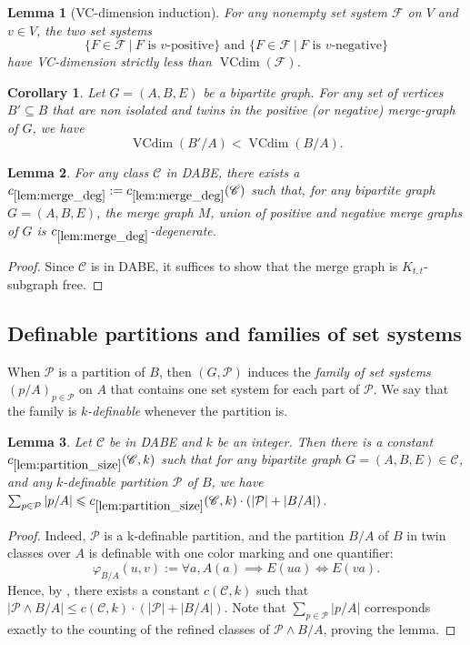 \documentclass[11pt]{article}
\newtheorem{corollary}[theorem]{Corollary}
\newtheorem{lemma}{Lemma}
\theoremstyle{definition}
\newcommand{\CC}{{\mathscr C}}
\newcommand{\inducedSS}[2]{#1/#2}%
\renewcommand{\leq}{\leqslant}
\renewcommand{\cal}{\mathcal}
\DeclareMathOperator{\VCdim}{VCdim}
\newcommand{\Pp}{\mathcal{P}}
\newcommand{\remph}[1]{{\color{red} \emph{#1}}}
\begin{document}
\begin{lemma}[VC-dimension induction]\label{lem:VC-induction-dabe}
For any nonempty set system $\cal F$ on $V$ and $v\in V$, the two set systems
\[
\{F \in \cal F ~|~F \text{ is $v$-positive}\} \text{ and } \{F \in \cal F ~|~F \text{ is $v$-negative}\}
\]
have VC-dimension strictly less than $\VCdim(\cal F)$.
\end{lemma}

\begin{corollary}\label{lem:blue-vc}
Let $G=(A,B,E)$ be a bipartite graph. For any set of vertices $B' \subseteq B$ that are non isolated and twins in the positive (or negative) merge-graph of $G$, we have
\[
\VCdim(\inducedSS{B'}{A}) < \VCdim(\inducedSS{B}{A}).
\]
\end{corollary}

\begin{lemma}\label{lem:merge_deg}
For any class $\CC$ in DABE, there exists a $c_{\ref{lem:merge_deg}} := c_{\ref{lem:merge_deg}} (\CC)$ such that, for any bipartite graph $G = (A, B, E)$, the merge graph $M$, union of positive and negative merge graphs of $G$ is $c_{\ref{lem:merge_deg}}$-degenerate.
\end{lemma}
\begin{proof}
Since $\CC$ is in DABE, it suffices to show that the merge graph is $K_{t, t}$-subgraph free.

\end{proof}
\subsection{Definable partitions and families of set systems}
When $\Pp$ is a partition of $B$, then $(G, \Pp)$ induces the \remph{family of set systems} $(p/A)_{p \in \Pp}$ on $A$ that contains one set system for each part of $\Pp$. We say that the family is \remph{$k$-definable} whenever the partition is.

\begin{lemma}\label{lem:partition_size}
Let $\CC$ be in DABE and $k$ be an integer. Then there is a constant $c_{\ref{lem:partition_size}}(\CC, k) $ such that
for any bipartite graph $G = (A, B, E) \in \CC$, and any $k$-definable partition $\Pp$ of $B$, we have $\sum_{p \in \Pp} |p/A| \leq c_{\ref{lem:partition_size}}(\CC, k) \cdot (|\Pp| + |B/A|)$.
\end{lemma}
\begin{proof}
Indeed, $\Pp$ is a k-definable partition, and the partition $B/A$ of $B$ in twin classes over $A$ is definable with one color marking and one quantifier:
\[
\varphi_{B/A} (u, v) := \forall a, A(a) \implies E(ua) \Leftrightarrow E(va).
\]
Hence, by , there exists a constant $c(\CC, k)$ such that $|\Pp \wedge B/A| \leqslant c(\CC, k) \cdot (|\Pp| + |B/A|)$.
Note that $\sum_{p \in \Pp} |p/A|$ corresponds exactly to the counting of the refined classes of $\Pp \wedge B/A$, proving the lemma.
\end{proof}
\end{document}
